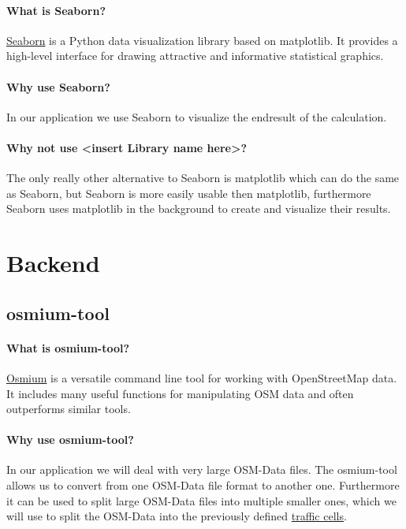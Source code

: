 \documentclass[letterpaper,10pt,english]{sphinxmanual}
\begin{document}
\paragraph{What is Seaborn?}
\href{https://seaborn.pydata.org/}{Seaborn} is a Python data visualization library based on matplotlib. It provides a high-level interface for drawing attractive and informative statistical graphics.

\paragraph{Why use Seaborn?}
In our application we use Seaborn to visualize the endresult of the calculation.

\paragraph{Why not use <insert Library name here>?}
The only really other alternative to Seaborn is matplotlib which can do the same as Seaborn, but Seaborn is more easily usable then matplotlib, furthermore Seaborn uses matplotlib in the background to create and visualize their results.

\section{Backend}

\subsection{osmium-tool}

\paragraph{What is osmium-tool?}
\href{https://osmcode.org/osmium-tool/}{Osmium}
is a versatile command line tool for working with OpenStreetMap data. It includes many useful functions for manipulating OSM data and often outperforms similar tools.

\paragraph{Why use osmium-tool?}
In our application we will deal with very large OSM-Data files.
The osmium-tool allows us to convert from one OSM-Data file format to another one. 
Furthermore it can be used to split large OSM-Data files into multiple smaller ones, which we will use to split the OSM-Data into the previously defined 
\hyperref[sec:Glossary]{traffic cells}.
\end{document}

